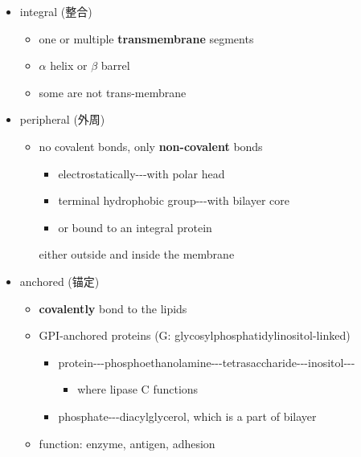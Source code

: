 \documentclass[]{article}
\begin{document}
\begin{itemize}
\item
  integral (整合)

  \begin{itemize}
  \item
    one or multiple \textbf{transmembrane} segments
  \item
    \(\alpha\) helix or \(\beta\) barrel
  \item
    some are not trans-membrane
  \end{itemize}
\item
  peripheral (外周)

  \begin{itemize}
  \item
    no covalent bonds, only \textbf{non-covalent} bonds

    \begin{itemize}
    \item
      electrostatically-\/-\/-with polar head
    \item
      terminal hydrophobic group-\/-\/-with bilayer core
    \item
      or bound to an integral protein
    \end{itemize}

     either outside and inside the membrane
  \end{itemize}
\item
  anchored (锚定)

  \begin{itemize}
  \item
    \textbf{covalently} bond to the lipids
  \item
    GPI-anchored proteins (G: glycosylphosphatidylinositol-linked)

    \begin{itemize}
    \item
      protein-\/-\/-phosphoethanolamine-\/-\/-tetrasaccharide-\/-\/-inositol-\/-\/-

      \begin{itemize}
      \item
        where lipase C functions
      \end{itemize}
    \item
      phosphate-\/-\/-diacylglycerol, which is a part of bilayer
    \end{itemize}
  \item
    function: enzyme, antigen, adhesion
  \end{itemize}
\end{itemize}
\end{document}
